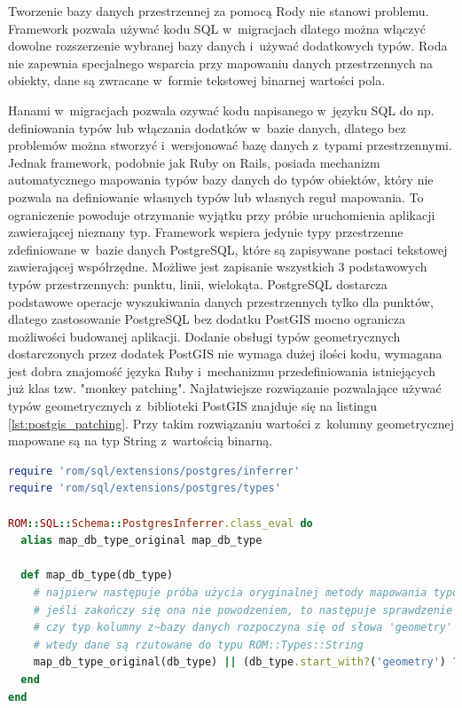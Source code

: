 \documentclass[archivemode]{mgr}
\begin{document}
 Tworzenie bazy danych przestrzennej za pomocą Rody nie stanowi problemu. Framework pozwala używać kodu SQL w~migracjach dlatego można włączyć dowolne rozszerzenie wybranej bazy danych i~używać dodatkowych typów. Roda nie zapewnia specjalnego wsparcia przy mapowaniu danych przestrzennych na obiekty, dane są zwracane w~formie tekstowej binarnej wartości pola.

 Hanami w~migracjach pozwala ozywać kodu napisanego w~języku SQL do np. definiowania typów lub włączania dodatków w~bazie danych, dlatego bez problemów można stworzyć i~wersjonować bazę danych z~typami przestrzennymi. Jednak framework, podobnie jak Ruby on Rails, posiada mechanizm automatycznego mapowania typów bazy danych do typów obiektów, który nie pozwala na definiowanie własnych typów lub własnych reguł mapowania. To ograniczenie powoduje otrzymanie wyjątku przy próbie uruchomienia aplikacji zawierającej nieznany typ. Framework wspiera jedynie typy przestrzenne zdefiniowane w~bazie danych PostgreSQL, które są zapisywane postaci tekstowej zawierającej współrzędne. Możliwe jest zapisanie wszystkich 3 podstawowych typów przestrzennych: punktu, linii, wielokąta. PostgreSQL dostarcza podstawowe operacje wyszukiwania danych przestrzennych tylko dla punktów, dlatego zastosowanie PostgreSQL bez dodatku PostGIS mocno ogranicza możliwości budowanej aplikacji. Dodanie obsługi typów geometrycznych dostarczonych przez dodatek PostGIS nie wymaga dużej ilości kodu, wymagana jest dobra znajomość języka Ruby i~mechanizmu przedefiniowania istniejących już klas tzw. "monkey patching". Najłatwiejsze rozwiązanie pozwalające używać typów geometrycznych z~biblioteki PostGIS znajduje się na listingu \ref{lst:postgis_patching}. Przy takim rozwiązaniu wartości z~kolumny geometrycznej mapowane są na typ String z~wartością binarną.

 

\begin{lstlisting}[language=Ruby, caption={Obsługa typów geometrycznych z~biblioteki PostGIS przez Hanami}, label=lst:postgis_patching]
require 'rom/sql/extensions/postgres/inferrer'
require 'rom/sql/extensions/postgres/types'

ROM::SQL::Schema::PostgresInferrer.class_eval do
  alias map_db_type_original map_db_type

  def map_db_type(db_type)
    # najpierw następuje próba użycia oryginalnej metody mapowania typów
    # jeśli zakończy się ona nie powodzeniem, to następuje sprawdzenie 
    # czy typ kolumny z~bazy danych rozpoczyna się od słowa 'geometry'
    # wtedy dane są rzutowane do typu ROM::Types::String
    map_db_type_original(db_type) || (db_type.start_with?('geometry') ? ROM::Types::String : nil)
  end
end
\end{lstlisting}
\end{document}
